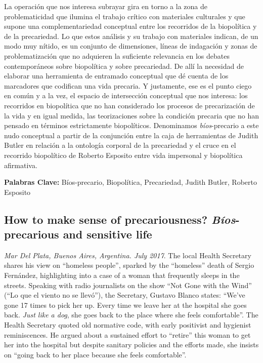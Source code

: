 \documentclass[a4paper,]{scrartcl}
\begin{document}
La operación que nos interesa subrayar gira en torno a la zona de
problematicidad que ilumina el trabajo crítico con materiales culturales
y que supone una complementariedad conceptual entre los recorridos de la
biopolítica y de la precariedad. Lo que estos análisis y su trabajo con
materiales indican, de un modo muy nítido, es un conjunto de
dimensiones, líneas de indagación y zonas de problematización que no
adquieren la suficiente relevancia en los debates contemporáneos sobre
biopolítica y sobre precariedad. De allí la necesidad de elaborar una
herramienta de entramado conceptual que dé cuenta de los marcadores que
codifican una vida precaria. Y justamente, ese es el punto ciego en
común y a la vez, el espacio de intersección conceptual que nos
interesa: los recorridos en biopolítica que no han considerado los
procesos de precarización de la vida y en igual medida, las
teorizaciones sobre la condición precaria que no han pensado en términos
estrictamente biopolíticos. Denominamos \emph{bíos}-precario a este nudo
conceptual a partir de la conjunción entre la caja de herramientas de
Judith Butler en relación a la ontología corporal de la precariedad y el
cruce en el recorrido biopolítico de Roberto Esposito entre vida
impersonal y biopolítica afirmativa.

\textbf{Palabras Clave:} Bíos-precario, Biopolítica, Precariedad, Judith
Butler, Roberto Esposito


\subsection{\texorpdfstring{\textbf{How to make sense of precariousness?
\emph{Bíos}-precarious and sensitive
life}}{How to make sense of precariousness? Bíos-precarious and sensitive life}}\label{how-to-make-sense-of-precariousness-buxedos-precarious-and-sensitive-life}

\emph{Mar Del Plata, Buenos Aires, Argentina. July 2017}. The local
Health Secretary shares his view on ``homeless people'', sparked by the
``homeless'' death of Sergio Fernández, highlighting into a case of a
woman that frequently sleeps in the streets. Speaking with radio
journalists on the show ``Not Gone with the Wind'' (``Lo que el viento
no se llevó''), the Secretary, Gustavo Blanco states: ``We've gone 17
times to pick her up. Every time we leave her at the hospital she goes
back. \emph{Just like a dog}, she goes back to the place where she feels
comfortable''. The Health Secretary quoted old normative code, with
early positivist and hygienist reminiscences. He argued about a
sustained effort to ``retire'' this woman to get her into the hospital
but despite sanitary policies and the efforts made, she insists on
``going back to her place because she feels comfortable''.
\end{document}
